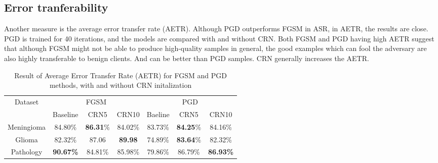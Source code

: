 \subsection{Error tranferability}




Another measure is the average error transfer rate (AETR). Although PGD outperforms FGSM in ASR, in AETR, the results are close. PGD is trained for 40 iterations, and the models are compared with and without CRN.
Both FGSM and PGD having high AETR suggest that although FGSM might not be able to produce high-quality samples in general, the good examples which can fool the adversary are also highly transferable to benign clients. And can be better than PGD samples. CRN generally increases the AETR. 




\begin{table*}[h!]
\centering
\setlength{\tabcolsep}{8pt}
\renewcommand\arraystretch{1.4}
\caption{Result of Average Error Transfer Rate (AETR) for FGSM and PGD methods, with and without CRN initalization }
\begin{tabular}{| *{7}{c|} }\hline
 Dataset&\multicolumn{3}{c|}{ FGSM}     &              \multicolumn{3}{c|}{ PGD}                                                                           \\  

 \cline{2-7}
&Baseline&CRN5 &CRN10&Baeline&CRN5&CRN10\\\hline

Meningioma&84.80\%&\textbf{86.31}\%&{84.02}\%&83.73\%  &\textbf{84.25}\%  &84.16\%\\\hline
Glioma&82.32\% &87.06&\textbf{89.98}&74.89\%&\textbf{83.64}\% &82.32\%\\\hline

Pathology&\textbf{90.67\%}&{84.81}\%&{85.98}\%&79.86\% &86.79\%&\textbf{86.93\%}\\\hline



\end{tabular}
\label{table_core} 
\end{table*}


